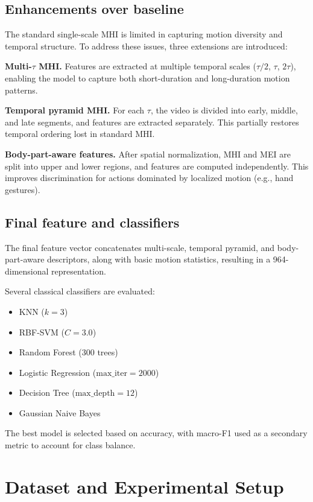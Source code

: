 \documentclass[11pt]{article}
\begin{document}
\subsection{Enhancements over baseline}
The standard single-scale MHI is limited in capturing motion diversity and temporal structure. To address these issues, three extensions are introduced:

\textbf{Multi-$\tau$ MHI.} Features are extracted at multiple temporal scales ($\tau/2$, $\tau$, $2\tau$), enabling the model to capture both short-duration and long-duration motion patterns.

\textbf{Temporal pyramid MHI.} For each $\tau$, the video is divided into early, middle, and late segments, and features are extracted separately. This partially restores temporal ordering lost in standard MHI.

\textbf{Body-part-aware features.} After spatial normalization, MHI and MEI are split into upper and lower regions, and features are computed independently. This improves discrimination for actions dominated by localized motion (e.g., hand gestures).


\subsection{Final feature and classifiers}

The final feature vector concatenates multi-scale, temporal pyramid, and body-part-aware descriptors, along with basic motion statistics, resulting in a 964-dimensional representation.

Several classical classifiers are evaluated:
\begin{itemize}
    \item KNN ($k=3$)
    \item RBF-SVM ($C=3.0$)
    \item Random Forest (300 trees)
    \item Logistic Regression ($\text{max\_iter}=2000$)
    \item Decision Tree ($\text{max\_depth}=12$)
    \item Gaussian Naive Bayes
\end{itemize}

The best model is selected based on accuracy, with macro-F1 used as a secondary metric to account for class balance.


\section{Dataset and Experimental Setup}
\end{document}
